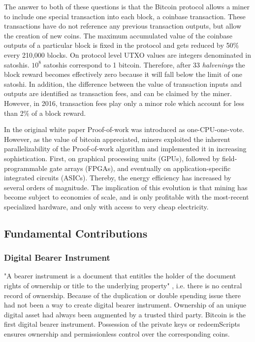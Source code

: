 The answer to both of these questions is that the Bitcoin protocol allows a miner to include one special transaction into each block, a coinbase transaction. These transactions have do not reference any previous transaction outputs, but allow the creation of new coins. The maximum accumulated value of the coinbase outputs of a particular block is fixed in the protocol and gets reduced by 50\% every 210,000 blocks. On protocol level UTXO values are integers denominated in satoshis. $10^8$ satoshis correspond to 1 bitcoin. Therefore, after 33 \emph{halvenings} the block reward becomes effectively zero because it will fall below the limit of one satoshi. In addition, the difference between the value of transaction inputs and outputs are identified as transaction fees, and can be claimed by the miner. However, in 2016, transaction fees play only a minor role which account for less than 2\% of a block reward.

In the original white paper Proof-of-work was introduced as one-CPU-one-vote. However, as the value of bitcoin appreciated, miners exploited the inherent parallelizability of the Proof-of-work algorithm and implemented it in increasing sophistication. First, on graphical processing units (GPUs), followed by field-programmable gate arrays (FPGAs), and eventually on application-specific integrated circuits (ASICs). Thereby, the energy efficiency has increased by several orders of magnitude. The implication of this evolution is that mining has become subject to economies of scale, and is only profitable with the most-recent specialized hardware, and only with access to very cheap electricity.   



\subsection{Fundamental Contributions}
\label{sec:btc_cont}

\subsubsection{Digital Bearer Instrument}

"A bearer instrument is a document that entitles the holder of the document rights of ownership or title to the underlying property" \cite{bearer}, i.e. there is no central record of ownership. Because of the duplication or double spending issue there had not been a way to create digital bearer instrument. Ownership of an unique digital asset had always been augmented by a trusted third party. Bitcoin is the first digital bearer instrument. Possession of the private keys or redeemScripts ensures ownership and permissionless control over the corresponding coins.

